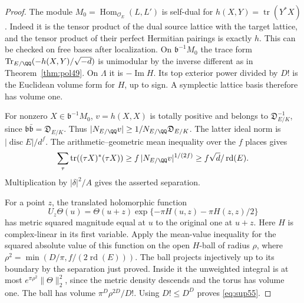 \documentclass[a4paper,11pt]{article}
\theoremstyle{definition}
\theoremstyle{remark}
\numberwithin{equation}{section}
\begin{document}
\begin{proof}
The module \(M_0=\operatorname{Hom}_{\mathcal O_E}(L,L')\) is
self-dual for \(h(X,Y)=\operatorname{tr}(Y^*X)\). Indeed it is
the tensor product of the dual source lattice with the target
lattice, and the tensor product of their perfect Hermitian
pairings is exactly \(h\). This can be checked on free bases after
localization. On \(\mathfrak b^{-1}M_0\) the trace form
\(\operatorname{Tr}_{E/\QQ}(-h(X,Y)/\sqrt{-d})\) is unimodular
by the inverse different as in Theorem~\ref{thm:pol49}. On
\(\Lambda\) it is \(-\operatorname{Im}H\). Its top exterior
power divided by \(D!\) is the Euclidean volume form for \(H\),
up to sign. A symplectic lattice basis therefore has volume one.

For nonzero \(X\in\mathfrak b^{-1}M_0\), \(v=h(X,X)\) is totally
positive and belongs to \(\mathfrak D_{E/K}^{-1}\), since
\(\mathfrak b\bar{\mathfrak b}=\mathfrak D_{E/K}\).
Thus \(|N_{E/\QQ}v|\ge1/N_{E/\QQ}\mathfrak D_{E/K}\).
The latter ideal norm is \(|\operatorname{disc}E|/d^f\).
The arithmetic--geometric mean inequality over the \(f\) places
gives
\[
   \sum_\tau\operatorname{tr}((\tau X)^*(\tau X))
       \ge f\,|N_{E/\QQ}v|^{1/(2f)}
       \ge f\sqrt d/\operatorname{rd}(E).
\]
Multiplication by \(|\delta|^2/A\) gives the asserted separation.

For a point \(z\), the translated holomorphic function
\[
 U_z\Theta(u)=\Theta(u+z)\exp\{-\pi H(u,z)-\pi H(z,z)/2\}
\]
has metric squared magnitude equal at \(u\) to the original one
at \(u+z\). Here \(H\) is complex-linear in its first variable.
Apply the mean-value inequality for the squared absolute value of
this function on the open \(H\)-ball of radius
\(\rho\), where \(\rho^2=\min(D/\pi,f/(2\operatorname{rd}(E)))\).
The ball projects injectively up to its boundary by the separation
just proved. Inside it the unweighted integral is at most
\(e^{\pi\rho^2}\|\Theta\|_2^2\), since the metric density descends
and the torus has volume one. The ball has volume
\(\pi^D\rho^{2D}/D!\). Using \(D!\le D^D\) proves \eqref{eq:sup55}.
\end{proof}
\end{document}
